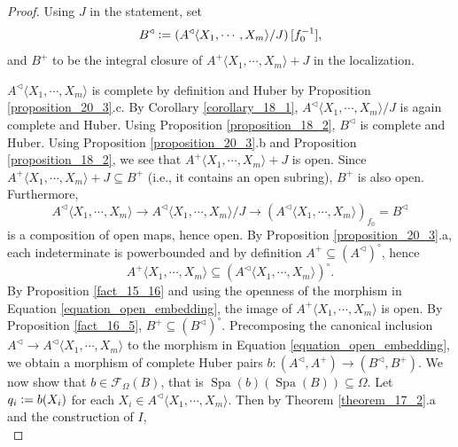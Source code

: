 \documentclass[10pt]{article}
\numberwithin{equation}{section}
\theoremstyle{definition}
\DeclareMathOperator{\Spa}{Spa}
\newcommand{\defeq}{\vcentcolon=}
\newcommand{\cF}[0]{\mathcal{F}}
\newcommand{\comppol}[1]{\langle X_1,\cdots, X_{#1}\rangle}
\begin{document}
\begin{proof}
    Using $J$ in the statement, set
    \begin{equation*}
        B^\triangleleft \defeq \left(A^\triangleleft\comppol{m}/J\right)[f_0^{-1}],
    \end{equation*}
    and $B^+$ to be the integral closure of $A^+\comppol{m}+J$ in the localization.
    \par $A^\triangleleft\comppol{m}$ is complete by definition and Huber by Proposition \ref{proposition_20_3}.c. By Corollary \ref{corollary_18_1}, $A^\triangleleft\comppol{m}/J$ is again complete and Huber. Using Proposition \ref{proposition_18_2}, $B^\triangleleft$ is complete and Huber. Using Proposition \ref{proposition_20_3}.b and Proposition \ref{proposition_18_2}, we see that $A^+\comppol{m}+J$ is open. Since $A^+\comppol{m}+J\subseteq B^+$ (i.e., it contains an open subring), $B^+$ is also open.
    Furthermore,
    \begin{equation}
        \label{equation_open_embedding}
        A^\triangleleft\comppol{m}\to A^\triangleleft\comppol{m}/J\to (A^\triangleleft\comppol{m})_{f_0}=B^\triangleleft
    \end{equation}
    is a composition of open maps, hence open. By Proposition \ref{proposition_20_3}.a, each indeterminate is powerbounded and by definition $A^+\subseteq(A^\triangleleft)^\circ$, hence
    \begin{equation*}
        A^+\comppol{m}\subseteq (A^\triangleleft\comppol{m})^\circ.
    \end{equation*}
    By Proposition \ref{fact_15_16} and using the openness of the morphism in Equation \eqref{equation_open_embedding}, the image of $A^+\comppol{m}$ is open. By Proposition \ref{fact_16_5}, $B^+\subseteq (B^\triangleleft)^\circ$.
    Precomposing the canonical inclusion $A^\triangleleft\to A^\triangleleft\comppol{m}$ to the morphism in Equation \eqref{equation_open_embedding}, we obtain a morphism of complete Huber pairs $b:(A^\triangleleft,A^+)\to(B^\triangleleft,B^+)$.
    We now show that $b\in\cF_\Omega(B)$, that is $\Spa(b)(\Spa(B))\subseteq\Omega$. Let $q_i \defeq b(X_i)$ for each $X_i\in A^\triangleleft\comppol{m}$. Then by Theorem \ref{theorem_17_2}.a and the construction of $I$,
    \begin{equation*}

\end{equation*}
\end{proof}
\end{document}
